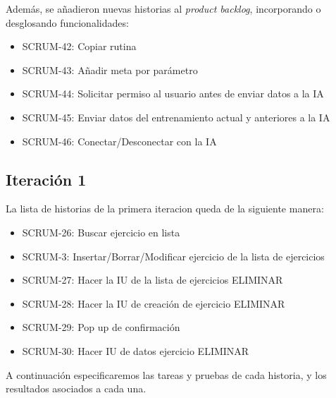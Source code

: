 Además, se añadieron nuevas historias al \textit{product backlog}, incorporando o desglosando funcionalidades:

\begin{itemize}
  \item SCRUM-42: Copiar rutina
  \item SCRUM-43: Añadir meta por parámetro
  \item SCRUM-44: Solicitar permiso al usuario antes de enviar datos a la IA
  \item SCRUM-45: Enviar datos del entrenamiento actual y anteriores a la IA
  \item SCRUM-46: Conectar/Desconectar con la IA
\end{itemize}



\subsection{Iteración 1}
La lista de historias de la primera iteracion queda de la siguiente manera:

\begin{itemize}
    \item SCRUM-26: Buscar ejercicio en lista
    \item SCRUM-3: Insertar/Borrar/Modificar ejercicio de la lista de ejercicios
    \item SCRUM-27: Hacer la IU de la lista de ejercicios ELIMINAR
    \item SCRUM-28: Hacer la IU de creación de ejercicio ELIMINAR
    \item SCRUM-29: Pop up de confirmación
    \item SCRUM-30: Hacer IU de datos ejercicio ELIMINAR
\end{itemize}

A continuación especificaremos las tareas y pruebas de cada historia, y los resultados asociados a cada una. 



